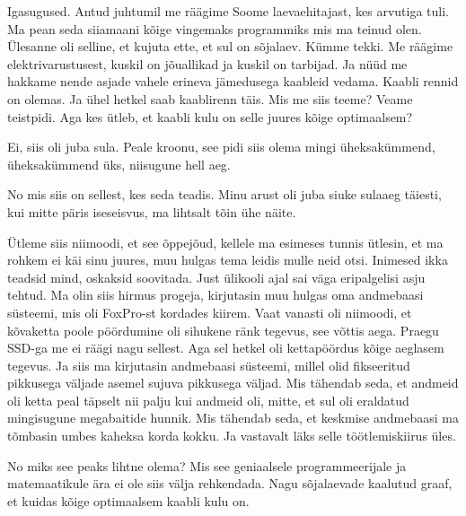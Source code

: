 
Igasugused. Antud juhtumil me räägime Soome laevaehitajast, kes arvutiga tuli. 
Ma pean seda siiamaani kõige vingemaks programmiks mis ma teinud olen. Ülesanne 
oli selline, et kujuta ette, et sul on sõjalaev. Kümme tekki. Me räägime 
elektrivarustusest, kuskil on jõuallikad ja kuskil on tarbijad. Ja nüüd me 
hakkame nende asjade vahele erineva jämedusega kaableid vedama. Kaabli rennid 
on olemas. Ja ühel hetkel saab kaablirenn täis. Mis me siis teeme? Veame 
teistpidi. Aga kes ütleb, et kaabli kulu on selle juures kõige optimaalsem? 


Ei, siis oli juba sula. Peale kroonu, see pidi siis olema mingi üheksakümmend, 
üheksakümmend üks, niisugune hell aeg.


No mis siis on sellest, kes seda teadis. Minu arust oli juba siuke sulaaeg 
täiesti, kui mitte päris iseseisvus, ma lihtsalt tõin ühe näite. 


Ütleme siis niimoodi, et see õppejõud, kellele ma esimeses tunnis ütlesin, et 
ma rohkem ei käi sinu juures, muu hulgas tema leidis mulle neid otsi. Inimesed 
ikka teadsid mind,  oskaksid soovitada. Just ülikooli ajal sai väga 
eripalgelisi asju tehtud. Ma olin siis hirmus progeja, kirjutasin muu hulgas 
oma andmebaasi süsteemi, mis oli FoxPro-st  kordades kiirem. Vaat vanasti oli 
niimoodi, et kõvaketta poole pöördumine oli sihukene ränk tegevus, see võttis 
aega. Praegu SSD-ga me ei räägi nagu sellest. Aga sel hetkel oli kettapöördus 
kõige aeglasem tegevus. Ja siis ma kirjutasin andmebaasi süsteemi, millel olid 
fikseeritud pikkusega väljade asemel  sujuva pikkusega väljad. Mis tähendab 
seda, et andmeid oli ketta peal täpselt nii palju kui andmeid oli, mitte, et 
sul oli eraldatud mingisugune megabaitide hunnik. Mis tähendab seda, et 
keskmise andmebaasi ma tõmbasin umbes kaheksa korda kokku. Ja vastavalt läks 
selle töötlemiskiirus  üles.


No miks see peaks lihtne olema? Mis see geniaalsele programmeerijale ja 
matemaatikule ära ei ole siis välja rehkendada. Nagu sõjalaevade kaalutud 
graaf, et kuidas kõige optimaalsem kaabli kulu on. 

